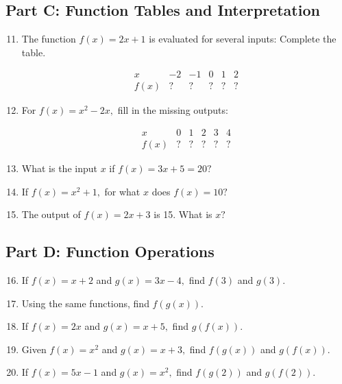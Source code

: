 \documentclass[14pt]{extarticle}
\begin{document}
\subsection*{Part C: Function Tables and Interpretation}
\begin{enumerate}
  \setcounter{enumi}{10}
  \item The function \(f(x) = 2x + 1\) is evaluated for several inputs:  
  Complete the table.  

  \[
  \begin{array}{c|ccccc}
  x & -2 & -1 & 0 & 1 & 2 \\ \hline
  f(x) & ? & ? & ? & ? & ?
  \end{array}
  \]

  \item For \(f(x) = x^2 - 2x,\) fill in the missing outputs:  

  \[
  \begin{array}{c|ccccc}
  x & 0 & 1 & 2 & 3 & 4 \\ \hline
  f(x) & ? & ? & ? & ? & ?
  \end{array}
  \]

  \item What is the input \(x\) if \(f(x) = 3x + 5 = 20?\)
  \item If \(f(x) = x^2 + 1,\) for what \(x\) does \(f(x) = 10?\)
  \item The output of \(f(x) = 2x + 3\) is 15. What is \(x?\)
\end{enumerate}

\subsection*{Part D: Function Operations}
\begin{enumerate}
  \setcounter{enumi}{15}
  \item If \(f(x) = x + 2\) and \(g(x) = 3x - 4,\) find \(f(3)\) and \(g(3).\)
  \item Using the same functions, find \(f(g(x)).\)
  \item If \(f(x) = 2x\) and \(g(x) = x + 5,\) find \(g(f(x)).\)
  \item Given \(f(x) = x^2\) and \(g(x) = x + 3,\) find \(f(g(x))\) and \(g(f(x)).\)
  \item If \(f(x) = 5x - 1\) and \(g(x) = x^2,\) find \(f(g(2))\) and \(g(f(2)).\)
\end{enumerate}
\end{document}
